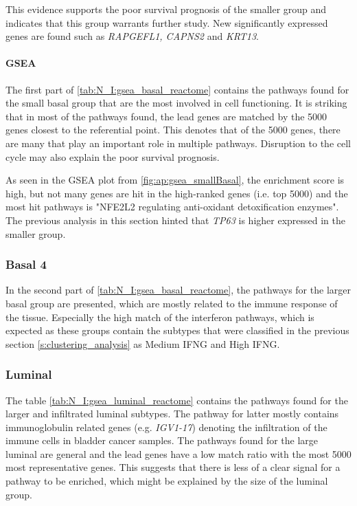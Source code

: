 This evidence supports the poor survival prognosis of the smaller group and indicates that this group warrants further study. New significantly expressed genes are found such as \textit{RAPGEFL1, CAPNS2} and \textit{KRT13}.


\paragraph*{GSEA}

The first part of \cref{tab:N_I:gsea_basal_reactome} contains the pathways found for the small basal group that are the most involved in cell functioning. It is striking that in most of the pathways found, the lead genes are matched by the 5000 genes closest to the referential point. This denotes that of the 5000 genes, there are many that play an important role in multiple pathways. Disruption to the cell cycle may also explain the poor survival prognosis. 

As seen in the GSEA plot from \cref{fig:ap:gsea_smallBasal}, the enrichment score is high, but not many genes are hit in the high-ranked genes (i.e. top 5000) and the most hit pathways is "NFE2L2 regulating anti-oxidant detoxification enzymes". The previous analysis in this section hinted that \textit{TP63} is higher expressed in the smaller group. 

\subsubsection* {Basal 4}

In the second part of \cref{tab:N_I:gsea_basal_reactome}, the pathways for the larger basal group are presented, which are mostly related to the immune response of the tissue. Especially the high match of the interferon pathways, which is expected as these groups contain the subtypes that were classified in the previous section \cref{s:clustering_analysis} as Medium IFNG and High IFNG. 


\subsubsection*{Luminal}

The table \cref{tab:N_I:gsea_luminal_reactome} contains the pathways found for the larger and infiltrated luminal subtypes. The pathway for latter mostly contains immunoglobulin related genes (e.g. \textit{IGV1-17}) denoting the infiltration of the immune cells in bladder cancer samples. The pathways found for the large luminal are general and the lead genes have a low match ratio with the most 5000 most representative genes. This suggests that there is less of a clear signal for a pathway to be enriched, which might be explained by the size of the luminal group. 

